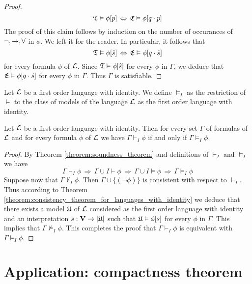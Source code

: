 \documentclass[10pt]{amsart}
\begin{document}
\begin{proof}
	$${\mathfrak T} \vDash \phi[p]\,\Leftrightarrow\,{\mathfrak E}\vDash\phi[q\cdot p]$$
	The proof of this claim follows by induction on the number of occurances of $\neg, \rightarrow,\forall$ in $\phi$. We left it for the reader. In particular, it follows that
	$${\mathfrak T} \vDash \phi[\hat{s}]\,\Leftrightarrow\,{\mathfrak E}\vDash\phi[q\cdot \hat{s}]$$
	for every formula $\phi$ of ${\mathcal L}$. Since ${\mathfrak T} \vDash \phi[\hat{s}]$ for every $\phi$ in $\Gamma$, we deduce that ${\mathfrak E}\vDash \phi[q\cdot \hat{s}]$ for every $\phi$ in $\Gamma$. Thus $\Gamma$ is satisfiable.
\end{proof}

\begin{definition}
	Let ${\mathcal L}$ be a first order language with identity. We define $\vDash_I$ as the restriction of $\vDash$ to the class of models of the language ${\mathcal L}$ as the first order language with identity.
\end{definition}

\begin{corollary}\label{corollary:Gödels_completeness_theorem_for_languages_with_identity}
	Let ${\mathcal L}$ be a first order language with identity. Then for every set $\Gamma$ of formulas of ${\mathcal L}$ and for every formula $\phi$ of ${\mathcal L}$ we have $\Gamma \vdash_I \phi$ if and only if $\Gamma \vDash_I \phi$.
\end{corollary}
\begin{proof}
	By Theorem \ref{theorem:soundness_theorem} and definitions of $\vdash_I$ and $\vDash_I$ we have
	$$\Gamma\vdash_I \phi\,\Rightarrow\,\Gamma\cup I\vdash \phi\,\Rightarrow\,\Gamma\cup I\vDash \phi\,\Rightarrow\,\Gamma\vDash_I\phi$$
	Suppose now that $\Gamma \nvdash_I \phi$. Then $\Gamma\cup \{(\neg \phi)\}$ is consistent with respect to $\vdash_I$. Thus according to Theorem \ref{theorem:consistency_theorem_for_languages_with_identity} we deduce that there exists a model ${\mathfrak U}$ of ${\mathcal L}$ considered as the first order language with identity and an interpretation $s:\mathbf{V}\rightarrow |{\mathfrak U}|$ such that ${\mathfrak U} \vDash \phi[s]$ for every $\phi$ in $\Gamma$. This implies that $\Gamma \nvDash_I \phi$. This completes the proof that $\Gamma \vdash_I \phi$ is equivalent with $\Gamma \vDash_I \phi$.
\end{proof}

\section{Application: compactness theorem}
\end{document}

